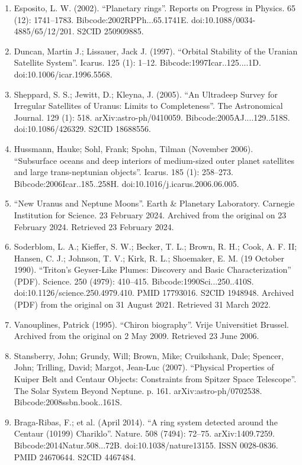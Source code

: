 \begin{enumerate}
\item Esposito, L. W. (2002). ``Planetary rings''. Reports on Progress in Physics. 65 (12): 1741–1783. Bibcode:2002RPPh...65.1741E. doi:10.1088/0034-4885/65/12/201. S2CID 250909885.
\item Duncan, Martin J.; Lissauer, Jack J. (1997). ``Orbital Stability of the Uranian Satellite System''. Icarus. 125 (1): 1–12. Bibcode:1997Icar..125....1D. doi:10.1006/icar.1996.5568.
\item Sheppard, S. S.; Jewitt, D.; Kleyna, J. (2005). ``An Ultradeep Survey for Irregular Satellites of Uranus: Limits to Completeness''. The Astronomical Journal. 129 (1): 518. arXiv:astro-ph/0410059. Bibcode:2005AJ....129..518S. doi:10.1086/426329. S2CID 18688556.
\item Hussmann, Hauke; Sohl, Frank; Spohn, Tilman (November 2006). ``Subsurface oceans and deep interiors of medium-sized outer planet satellites and large trans-neptunian objects''. Icarus. 185 (1): 258–273. Bibcode:2006Icar..185..258H. doi:10.1016/j.icarus.2006.06.005.
\item ``New Uranus and Neptune Moons''. Earth \& Planetary Laboratory. Carnegie Institution for Science. 23 February 2024. Archived from the original on 23 February 2024. Retrieved 23 February 2024.
\item Soderblom, L. A.; Kieffer, S. W.; Becker, T. L.; Brown, R. H.; Cook, A. F. II; Hansen, C. J.; Johnson, T. V.; Kirk, R. L.; Shoemaker, E. M. (19 October 1990). ``Triton's Geyser-Like Plumes: Discovery and Basic Characterization'' (PDF). Science. 250 (4979): 410–415. Bibcode:1990Sci...250..410S. doi:10.1126/science.250.4979.410. PMID 17793016. S2CID 1948948. Archived (PDF) from the original on 31 August 2021. Retrieved 31 March 2022.
\item Vanouplines, Patrick (1995). ``Chiron biography''. Vrije Universitiet Brussel. Archived from the original on 2 May 2009. Retrieved 23 June 2006.
\item Stansberry, John; Grundy, Will; Brown, Mike; Cruikshank, Dale; Spencer, John; Trilling, David; Margot, Jean-Luc (2007). ``Physical Properties of Kuiper Belt and Centaur Objects: Constraints from Spitzer Space Telescope''. The Solar System Beyond Neptune. p. 161. arXiv:astro-ph/0702538. Bibcode:2008ssbn.book..161S.
\item Braga-Ribas, F.; et al. (April 2014). ``A ring system detected around the Centaur (10199) Chariklo''. Nature. 508 (7494): 72–75. arXiv:1409.7259. Bibcode:2014Natur.508...72B. doi:10.1038/nature13155. ISSN 0028-0836. PMID 24670644. S2CID 4467484.

\end{enumerate}
